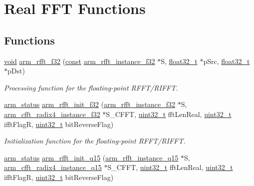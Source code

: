 \hypertarget{group___r_f_f_t___r_i_f_f_t}{\section{Real F\-F\-T Functions}
\label{group___r_f_f_t___r_i_f_f_t}
}
\subsection*{Functions}
\begin{DoxyCompactItemize}
\item 
\hyperlink{group___n_a_m_e_ga18028b8badbf1ea7e704ccac3c488e82}{void} \hyperlink{group___r_f_f_t___r_i_f_f_t_ga3df1766d230532bc068fc4ed69d0fcdc}{arm\-\_\-rfft\-\_\-f32} (\hyperlink{group___n_a_m_e_ga7ae6d0e43244213b34de2c2b9aa30da6}{const} \hyperlink{structarm__rfft__instance__f32}{arm\-\_\-rfft\-\_\-instance\-\_\-f32} $\ast$S, \hyperlink{arm__math_8h_a4611b605e45ab401f02cab15c5e38715}{float32\-\_\-t} $\ast$p\-Src, \hyperlink{arm__math_8h_a4611b605e45ab401f02cab15c5e38715}{float32\-\_\-t} $\ast$p\-Dst)
\begin{DoxyCompactList}\small\item\em Processing function for the floating-\/point R\-F\-F\-T/\-R\-I\-F\-F\-T. \end{DoxyCompactList}\item 
\hyperlink{arm__math_8h_a5e459c6409dfcd2927bb8a57491d7cf6}{arm\-\_\-status} \hyperlink{group___r_f_f_t___r_i_f_f_t_ga10717ee326bf50832ef1c25b85a23068}{arm\-\_\-rfft\-\_\-init\-\_\-f32} (\hyperlink{structarm__rfft__instance__f32}{arm\-\_\-rfft\-\_\-instance\-\_\-f32} $\ast$S, \hyperlink{structarm__cfft__radix4__instance__f32}{arm\-\_\-cfft\-\_\-radix4\-\_\-instance\-\_\-f32} $\ast$S\-\_\-\-C\-F\-F\-T, \hyperlink{stdint_8h_a435d1572bf3f880d55459d9805097f62}{uint32\-\_\-t} fft\-Len\-Real, \hyperlink{stdint_8h_a435d1572bf3f880d55459d9805097f62}{uint32\-\_\-t} ifft\-Flag\-R, \hyperlink{stdint_8h_a435d1572bf3f880d55459d9805097f62}{uint32\-\_\-t} bit\-Reverse\-Flag)
\begin{DoxyCompactList}\small\item\em Initialization function for the floating-\/point R\-F\-F\-T/\-R\-I\-F\-F\-T. \end{DoxyCompactList}\item 
\hyperlink{arm__math_8h_a5e459c6409dfcd2927bb8a57491d7cf6}{arm\-\_\-status} \hyperlink{group___r_f_f_t___r_i_f_f_t_ga2530ebf44b7f5b559b191ff7265a9120}{arm\-\_\-rfft\-\_\-init\-\_\-q15} (\hyperlink{structarm__rfft__instance__q15}{arm\-\_\-rfft\-\_\-instance\-\_\-q15} $\ast$S, \hyperlink{structarm__cfft__radix4__instance__q15}{arm\-\_\-cfft\-\_\-radix4\-\_\-instance\-\_\-q15} $\ast$S\-\_\-\-C\-F\-F\-T, \hyperlink{stdint_8h_a435d1572bf3f880d55459d9805097f62}{uint32\-\_\-t} fft\-Len\-Real, \hyperlink{stdint_8h_a435d1572bf3f880d55459d9805097f62}{uint32\-\_\-t} ifft\-Flag\-R, \hyperlink{stdint_8h_a435d1572bf3f880d55459d9805097f62}{uint32\-\_\-t} bit\-Reverse\-Flag)

\end{DoxyCompactItemize}
